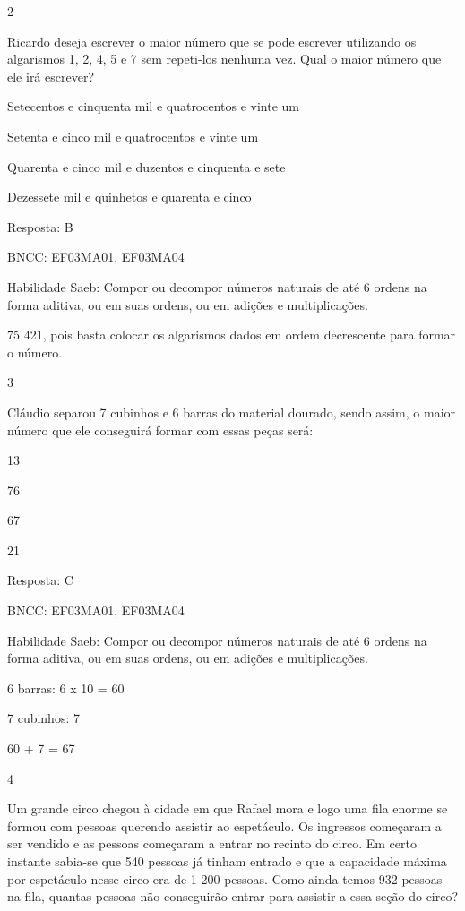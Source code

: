 \begin{escolha}
\num{2}

Ricardo deseja escrever o maior número que se pode escrever utilizando
os algarismos 1, 2, 4, 5 e 7 sem repeti-los nenhuma vez. Qual o maior
número que ele irá escrever?

\begin{escolha}
\item
  Setecentos e cinquenta mil e quatrocentos e vinte um
\item
  Setenta e cinco mil e quatrocentos e vinte um
\item
  Quarenta e cinco mil e duzentos e cinquenta e sete
\item
  Dezessete mil e quinhetos e quarenta e cinco
\end{escolha}

Resposta: B

BNCC: EF03MA01, EF03MA04

Habilidade Saeb: Compor ou decompor números naturais de até 6 ordens na
forma aditiva, ou em suas ordens, ou em adições e multiplicações.

75 421, pois basta colocar os algarismos dados em ordem decrescente para
formar o número.

\num{3}

Cláudio separou 7 cubinhos e 6 barras do material dourado, sendo assim,
o maior número que ele conseguirá formar com essas peças será:

\begin{escolha}
\item
  13
\item
  76
\item
  67
\item
  21
\end{escolha}

Resposta: C

BNCC: EF03MA01, EF03MA04

Habilidade Saeb: Compor ou decompor números naturais de até 6 ordens na
forma aditiva, ou em suas ordens, ou em adições e multiplicações.

6 barras: 6 x 10 = 60

7 cubinhos: 7

60 + 7 = 67

\num{4}

Um grande circo chegou à cidade em que Rafael mora e logo uma fila
enorme se formou com pessoas querendo assistir ao espetáculo. Os
ingressos começaram a ser vendido e as pessoas começaram a entrar no
recinto do circo. Em certo instante sabia-se que 540 pessoas já tinham
entrado e que a capacidade máxima por espetáculo nesse circo era de 1
200 pessoas. Como ainda temos 932 pessoas na fila, quantas pessoas não
conseguirão entrar para assistir a essa seção do circo?


\end{escolha}
